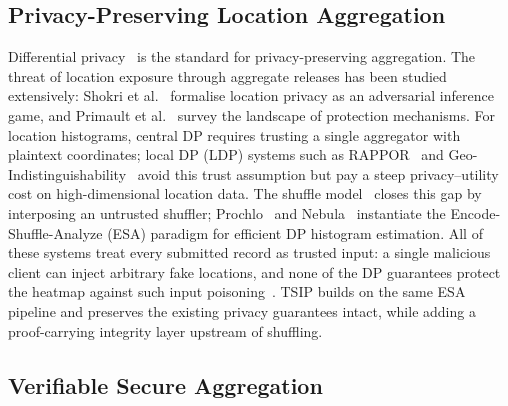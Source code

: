 \documentclass[conference]{IEEEtran}
\theoremstyle{definition}
\theoremstyle{plain}
\begin{document}
\subsection{Privacy-Preserving Location Aggregation}

Differential privacy~\cite{Dwork2006calibrating,Dwork2014algorithmic} is the
standard for privacy-preserving aggregation. The threat of location exposure
through aggregate releases has been studied extensively:
Shokri et al.~\cite{Shokri2011Quantifying} formalise location privacy as
an adversarial inference game, and Primault et al.~\cite{Primault2019Survey}
survey the landscape of protection mechanisms.
For location histograms, central DP requires trusting a single aggregator
with plaintext coordinates; local DP (LDP) systems such as
RAPPOR~\cite{Erlingsson2014RAPPOR} and
Geo-Indistinguishability~\cite{Andres2013geoi} avoid this trust assumption
but pay a steep privacy--utility cost on high-dimensional location data.
The shuffle model~\cite{Balle2019privacy,Cheu2019distributed,Balle2020PrivateSummation,Ghazi2021Power}
closes this gap by interposing an untrusted shuffler;
Prochlo~\cite{Bittau2017Prochlo} and Nebula~\cite{Roth2019Nebula} instantiate
the Encode-Shuffle-Analyze (ESA) paradigm for efficient DP histogram
estimation. All of these systems treat every submitted record as trusted
input: a single malicious client can inject arbitrary fake locations, and
none of the DP guarantees protect the heatmap against such input
poisoning~\cite{Melis2019Inference}.
\textsc{TSIP} builds on the same ESA pipeline and preserves the existing
privacy guarantees intact, while adding a proof-carrying integrity layer
upstream of shuffling.

\subsection{Verifiable Secure Aggregation}
\end{document}
